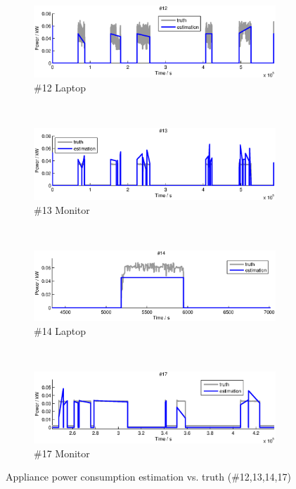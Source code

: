 \begin{figure}[p]
    \centering
    \begin{subfigure}[t]{\textwidth}
        \centering
        \includegraphics[width=\textwidth] {../../sw/pc/matlab/disagg-result/power-12.eps}
        \caption{\#12 Laptop}
    \end{subfigure} 
    \\
    \begin{subfigure}[t]{\textwidth}
        \centering
        \includegraphics[width=\textwidth] {../../sw/pc/matlab/disagg-result/power-13.eps}
        \caption{\#13 Monitor}
    \end{subfigure}
    \\
    \begin{subfigure}[t]{\textwidth}
        \centering
        \includegraphics[width=\textwidth] {../../sw/pc/matlab/disagg-result/power-14.eps}
        \caption{\#14 Laptop}
    \end{subfigure}
    \\
    \begin{subfigure}[t]{\textwidth}
        \centering
        \includegraphics[width=\textwidth] {../../sw/pc/matlab/disagg-result/power-17.eps}
        \caption{\#17 Monitor}
    \end{subfigure}
    \caption{Appliance power consumption estimation vs. truth (\#12,13,14,17)}\label{fig:power-12-13-14-17}
\end{figure}

